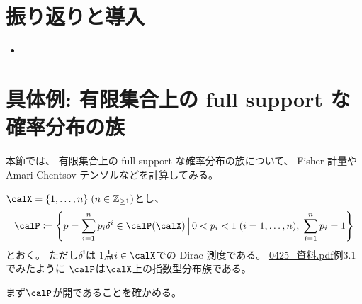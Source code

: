 \documentclass[report]{jlreq}
\begin{document}
%

%
\section*{振り返りと導入}

\begin{itemize}
    \item \TODO{}
\end{itemize}


%
\section{具体例: 有限集合上の full support な確率分布の族}

本節では、
有限集合上の full support な確率分布の族について、
Fisher 計量や Amari-Chentsov テンソルなどを計算してみる。

\begin{settings}
    $\calX = \{ 1, \dots, n \} \; (n \in \Z_{\ge 1})$とし、
    \begin{equation}
        \calP \coloneqq \mybrace{
            p = \sum_{i = 1}^n p_i \delta^i
            \in \calP(\calX)
            \, \Big| \,
            0 < p_i < 1 \; (i = 1, \dots, n), \;
            \sum_{i = 1}^n p_i = 1
        }
    \end{equation}
    とおく。
    ただし$\delta^i$は
    1点$i \in \calX$での Dirac 測度である。
    \url{0425_資料.pdf}例3.1でみたように
    $\calP$は$\calX$上の指数型分布族である。
\end{settings}

まず$\calP$が開であることを確かめる。
\end{document}
